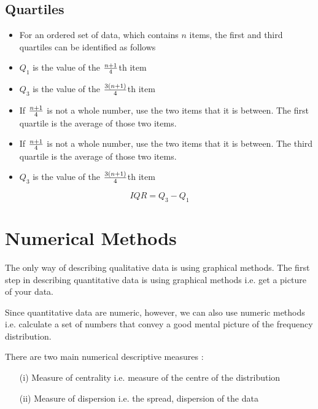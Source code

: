 \documentclass[]{report}
\begin{document}
{\subsection{Quartiles}

\begin{itemize}
\item For an ordered set of data, which contains $n$ items, the first and third quartiles can be identified as follows

\item $Q_1$ is the value of the $ {n+1\over 4}$th item


\item $Q_3$ is the value of the $ {3(n+1)\over 4}$th item


\item If ${n+1\over 4}$ is not a whole number, use the two items that it is between. The first quartile is the average of those two items.

\item If ${n+1\over 4}$ is not a whole number, use the two items that it is between. The third quartile is the average of those two items.

\item $Q_3$ is the value of the $ {3(n+1)\over 4}$th item
\end{itemize}


\[ IQR = Q_3 - Q_1 \]


\newpage
\section{ Numerical Methods}
The only way of describing qualitative data is using graphical methods. The first step in describing quantitative data is using graphical methods i.e. get a picture of your data. 

Since quantitative data are numeric, however, we can also use numeric methods i.e. calculate a set of numbers that convey a good mental picture of the frequency distribution. 

There are two main numerical descriptive measures :

\begin{itemize}
\item[(i)] Measure of centrality i.e. measure of the centre of the distribution

\item[(ii)] Measure of dispersion i.e. the spread, dispersion of the data
\end{itemize}

}
\end{document}
